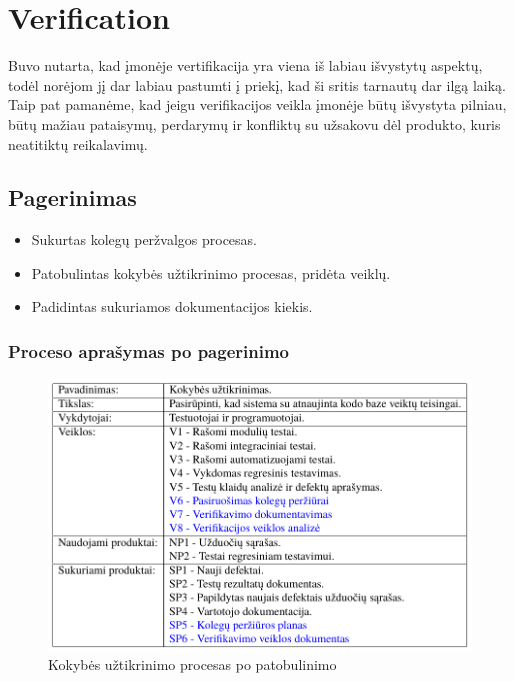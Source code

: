 \documentclass{VUMIFPSkursinis}
\begin{document}
	\section{Verification}
		Buvo nutarta, kad įmonėje vertifikacija yra viena iš labiau išvystytų aspektų, todėl norėjom jį dar labiau pastumti į priekį, kad ši sritis tarnautų dar ilgą laiką. 
		Taip pat pamanėme, kad jeigu verifikacijos veikla įmonėje būtų išvystyta pilniau, būtų mažiau pataisymų, perdarymų ir konfliktų su užsakovu dėl produkto, kuris neatitiktų reikalavimų.
		\subsection{Pagerinimas}
			\begin{itemize}
				\item{Sukurtas kolegų peržvalgos procesas.}
				\item{Patobulintas kokybės užtikrinimo procesas, pridėta veiklų.}
				\item{Padidintas sukuriamos dokumentacijos kiekis.}
			\end{itemize}
			\subsubsection{Proceso aprašymas po pagerinimo}
				\begin{figure}[!htbp]
					\includegraphics[scale=0.8]{img/kokybepo}
					\caption{Kokybės užtikrinimo procesas po patobulinimo} %
					\label{img:ProfilisPo}
				\end{figure}

\pagebreak
\end{document}
